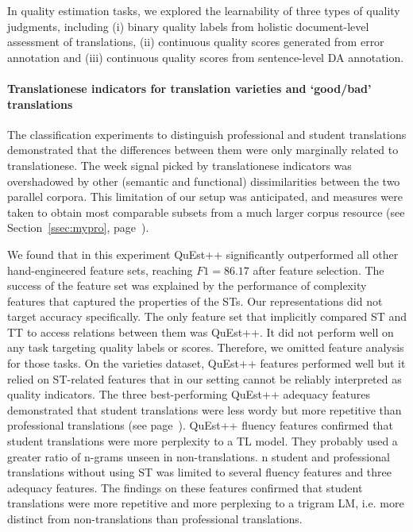 In quality estimation tasks, we explored the learnability of three types of quality judgments, including (i) binary quality labels from holistic document-level assessment of translations, (ii) continuous quality scores generated from error annotation and (iii) continuous quality scores from sentence-level DA annotation. 

\paragraph{Translationese indicators for translation varieties and `good/bad' translations}  %
The classification experiments to distinguish professional and student translations demonstrated that the differences between them were only marginally related to translationese. The week signal picked by translationese indicators was overshadowed by other (semantic and functional) dissimilarities between the two parallel corpora. This limitation of our setup was anticipated, and measures were taken to obtain most comparable subsets from a much larger corpus resource (see Section~\ref{ssec:mypro}, page~\pageref{pg:stu_pro_made_comparable}).

We found that in this experiment QuEst++ significantly outperformed all other hand-engineered feature sets, reaching $F1=86.17$ after feature selection. The success of the feature set was explained by the performance of complexity features that captured the properties of the STs. 
Our representations did not target accuracy specifically. The only feature set that implicitly compared ST and TT to access relations between them was QuEst++. It did not perform well on any task targeting quality labels or scores. Therefore, we omitted feature analysis for those tasks.
On the varieties dataset, QuEst++ features performed well but it relied on ST-related features that in our setting cannot be reliably interpreted as quality indicators. The three best-performing QuEst++ adequacy features demonstrated that student translations were less wordy but more repetitive than professional translations (see page~\pageref{pg:quest_adequacy_feats_for_vars}). QuEst++ fluency features confirmed that student translations were more perplexity to a TL model. They probably used a greater ratio of n-grams unseen in non-translations. n student and professional translations without using ST was limited to several fluency features and three adequacy features. The findings on these features confirmed that student translations were more repetitive and more perplexing to a trigram LM, i.e. more distinct from non-translations than professional translations. 


